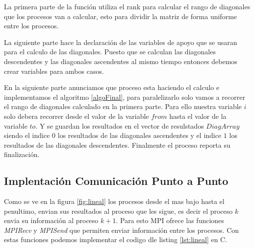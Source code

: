 \documentclass[10pt]{IEEEtran}
\begin{document}
La primera parte de la función utiliza el rank para calcular el rango de diagonales que los procesos van a calcular, esto para dividir la matriz de forma uniforme entre los procesos.

La siguiente parte hace la declaración de las variables de apoyo que se usaran para el calculo de las diagonales. Puesto que se calculan las diagonales descendentes y las diagonales ascendentes al mismo tiempo entonces debemos crear variables para ambos casos.

En la siguiente parte anunciamos que proceso esta haciendo el calculo e implementamos el algoritmo \ref{algoFinal}, para paralelizarlo solo vamos a recorrer el rango de diagonales calculado en la primera parte. Para ello nuestra variable $i$ solo debera recorrer desde el valor de la variable $from$ hasta el valor de la variable $to$. Y se guardan los resultados en el vector de resulstados $DiagArray$ siendo el indice $0$ los resultados de las diagonales ascendentes y el indice $1$ los resultados de las diagonales descendentes. Finalmente el proceso reporta su finalización.

\subsection{Implentación Comunicación Punto a Punto}
Como se ve en la figura \ref{fig:lineal} los procesos desde el mas bajo hasta el penultimo, envian sus resultados al proceso que les sigue, es decir el proceso $k$ envia su información al proceso $k+1$. Para esto MPI ofrece las funciones \textit{MPI\textunderscore Recv} y \textit{MPI\textunderscore Send} que permiten enviar información entre los procesos. Con estas funciones podemos implementar el codigo dle listing \ref{lst:lineal} en C.
\end{document}
